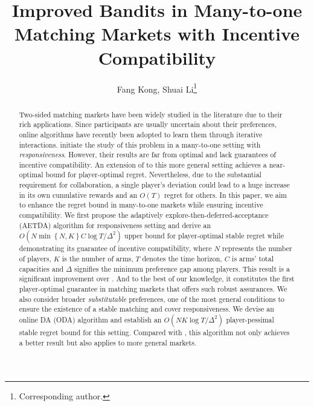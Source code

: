 \documentclass[letterpaper]{article} %
\title{
Improved Bandits in Many-to-one Matching Markets with Incentive Compatibility
}
\author {
    Fang Kong, Shuai Li\thanks{Corresponding author.}
}
\newcommand{\set}[1]{\left\{ #1 \right\}}
\begin{document}
\maketitle

\begin{abstract}
Two-sided matching markets have been widely studied in the literature due to their rich applications. Since participants are usually uncertain about their preferences, online algorithms have recently been adopted to learn them through iterative interactions. \citet{wang2022bandit} initiate the study of this problem in a many-to-one setting with \textit{responsiveness}. However, their results are far from optimal and lack guarantees of incentive compatibility. An extension of \citet{kong2023player} to this more general setting achieves a near-optimal bound for player-optimal regret. Nevertheless, due to the substantial requirement for collaboration, a single player's deviation could lead to a huge increase in its own cumulative rewards and an $O(T)$ regret for others. In this paper, we aim to enhance the regret bound in many-to-one markets while ensuring incentive compatibility. We first propose the adaptively explore-then-deferred-acceptance (AETDA) algorithm for responsiveness setting and derive an $O(N\min\set{N,K}C\log T/\Delta^2)$ upper bound for player-optimal stable regret while demonstrating its guarantee of incentive compatibility, where $N$ represents the number of players, $K$ is the number of arms, $T$ denotes the time horizon, $C$ is arms' total capacities and $\Delta$ signifies the minimum preference gap among players. This result is a significant improvement over \citet{wang2022bandit}. And to the best of our knowledge, it constitutes the first player-optimal guarantee in matching markets that offers such robust assurances. We also consider broader \textit{substitutable} preferences, one of the most general conditions to ensure the existence of a stable matching and cover responsiveness. We devise an online DA (ODA) algorithm and establish an $O(NK\log T/\Delta^2)$ player-pessimal stable regret bound for this setting. Compared with \citet{wang2022bandit}, this algorithm not only achieves a better result but also applies to more general markets.
\end{abstract}













% 
\end{document}
